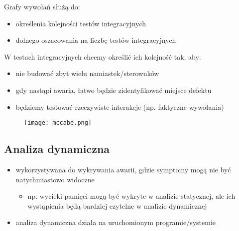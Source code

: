 \documentclass[../main.tex]{subfiles}
\begin{document}
    Grafy wywołań służą do:
    \begin{itemize}
        \item określenia kolejności testów integracyjnych
        \item dolnego oszacowania na liczbę testów integracyjnych
    \end{itemize}

    W testach integracyjnych chcemy określić ich kolejność tak, aby:
    \begin{itemize}
        \item nie budować zbyt wielu namiastek/sterownków
        \item gdy nastąpi awaria, łatwo będzie zidentyfikować miejsce defektu
        \item będziemy testować rzeczywiste interakcje (np. faktyczne wywołania)
    \end{itemize}

    \begin{figure}[H]
        \texttt{[image: mccabe.png]}
    \end{figure}

    \subsection{Analiza dynamiczna}
    \begin{itemize}
        \item wykorzystywana do wykrywania awarii, gdzie symptomy mogą nie być natychmiastowo widoczne
        \begin{itemize}
            \item np. wycieki pamięci mogą być wykryte w analizie statycznej, ale
            ich wystąpienia będą bardziej czytelne w analizie dynamicznej
        \end{itemize}
        \item analiza dynamiczna działa na uruchomionym programie/systemie
    \end{itemize}
\end{document}
